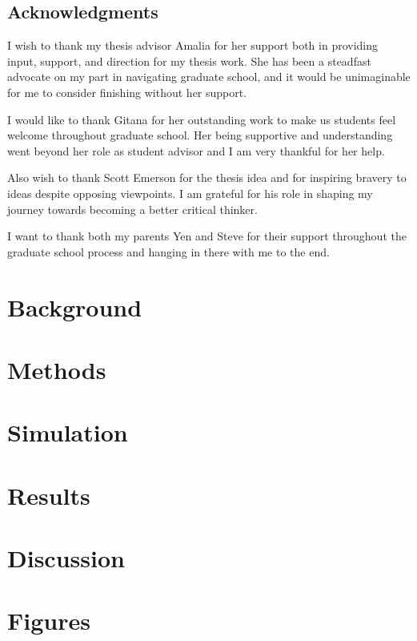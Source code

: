 
\frontmatter

\thetitlepage
\cleardoublepage
\setcounter{page}{1}

\thecopyrightpage
\theumiabstract
\cleardoublepage

\section{Acknowledgments}
I wish to thank my thesis advisor Amalia for her support both in providing input, support, and direction for my thesis work. 
She has been a steadfast advocate on my part in navigating graduate school, and it would be unimaginable for me to consider finishing without her support.

I would like to thank Gitana for her outstanding work to make us students feel welcome throughout graduate school.
Her being supportive and understanding went beyond her role as student advisor and I am very thankful for her help. 

Also wish to thank Scott Emerson for the thesis idea and for inspiring bravery to ideas despite opposing viewpoints.
I am grateful for his role in shaping my journey towards becoming a better critical thinker. 

I want to thank both my parents Yen and Steve for their support throughout the graduate school process and hanging in there with me to the end.

\clearpage

\tableofcontents\clearpage
\listoffigures\clearpage
\listoftables\clearpage

\mainmatter

\chapter{Background}

\chapter{Methods}

\chapter{Simulation}

\chapter{Results}

\chapter{Discussion}

\chapter{Figures}


% 
\nocite{*}
% 
\printbibliography 
